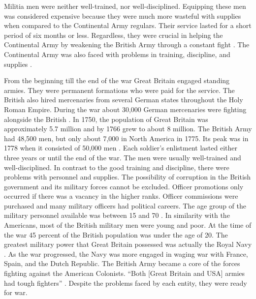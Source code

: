 Militia men were neither well-trained, nor well-disciplined.  Equipping these
men was considered expensive because they were much more wasteful with supplies
when compared to the Continental Army regulars.  Their service lasted for a
short period of six months or less. Regardless, they were crucial in helping the
Continental Army by weakening the British Army through a constant fight
\cite[p.52]{pancake_1985}.  The Continental Army was also faced with problems in training,
discipline, and supplies \cite[p.47]{pancake_1985}.

From the beginning till the end of the war Great Britain engaged standing
armies.  They were permanent formations who were paid for the service.  The
British also hired mercenaries from several German states throughout the Holy
Roman Empire.  During the war about 30,000 German mercenaries were fighting
alongside the British \cite[p.62]{stewart_2005}.  In 1750, the population of Great Britain
was approximately 5.7 million and by 1766 grew to about 8 million.  The British
Army had 48,500 men, but only about 7,000 in North America in 1775.  Its peak
was in 1778 when it consisted of 50,000 men \cite[37]{stephenson_patriot_2007}
\cite[1]{knollenberg_growth_2003}.  Each soldier’s enlistment lasted either three years or until the end of
the war.  The men were usually well-trained and well-disciplined.  In contrast
to the good training and discipline, there were problems with personnel and
supplies.  The possibility of corruption in the British government and its
military forces cannot be excluded.  Officer promotions only occurred if there
was a vacancy in the higher ranks.  Officer commissions were purchased and many
military officers had political careers.  The age group of the military
personnel available was between 15 and 70 \cite[p.39-43]{pancake_1985}.  In similarity
with the Americans, most of the British military men were young and poor.  At
the time of the war 45 percent of the British population was under the age of
20.  The greatest military power that Great Britain possessed was actually the
Royal Navy \cite[p.42-43]{stephenson_patriot_2007}.  As the war progressed, the Navy was more
engaged in waging war with France, Spain, and the Dutch Republic.  The British
Army became a core of the forces fighting against the American Colonists.  “Both
[Great Britain and USA] armies had tough fighters” \cite[p.55]{pancake_1985}. Despite the
problems faced by each entity, they were ready for war.

